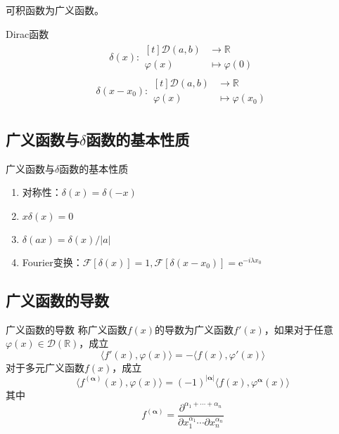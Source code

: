 \documentclass[lang = cn, scheme = chinese, thmcnt = section]{elegantbook}
\newcommand{\R}{\mathbb{R}}            %
\newcommand{\bs}{\boldsymbol}          %
\newcommand{\ee}[1]{\mathrm{e}^{#1}}   %
\begin{document}
\begin{remark}
	可积函数为广义函数。
\end{remark}

\begin{definition}{Dirac函数}
	\begin{align*}
		\delta(x):\begin{aligned}[t]
			\mathscr{D}(a,b) &\longrightarrow \R\\
			\varphi(x) &\longmapsto \varphi(0)
		\end{aligned}
	\end{align*}
	\begin{align*}
		\delta(x-x_0):\begin{aligned}[t]
			\mathscr{D}(a,b) &\longrightarrow \R\\
			\varphi(x) &\longmapsto \varphi(x_0)
		\end{aligned}
	\end{align*}
\end{definition}

\subsection{广义函数与$\delta$函数的基本性质}

\begin{proposition}{广义函数与$\delta$函数的基本性质}
	\begin{enumerate}
		\item 对称性：$\delta(x)=\delta(-x)$
		\item $x\delta(x)=0$
		\item $\delta(ax)=\delta(x)/|a|$
		\item Fourier变换：$\mathscr{F}[\delta(x)]=1,\mathscr{F}[\delta(x-x_0)]=\ee{-i\lambda x_0}$
	\end{enumerate}
\end{proposition}

\subsection{广义函数的导数}

\begin{definition}{广义函数的导数}
	称广义函数$f(x)$的导数为广义函数$f'(x)$，如果对于任意$\varphi(x)\in\mathscr{D}(\R)$，成立%
	$$
	\langle f'(x),\varphi(x) \rangle=-\langle f(x),\varphi'(x) \rangle
	$$
	对于多元广义函数$f(x)$，成立
	$$
	\langle f^{(\bs{\alpha})}(x),\varphi(x) \rangle=(-1)^{|\bs{\alpha}|}\langle f(x),\varphi^{\bs{\alpha}}(x) \rangle
	$$
	其中%
	$$
	f^{(\bs{\alpha})}=\frac{\partial^{\alpha_1+\cdots+\alpha_n}}{\partial x_1^{\alpha_1}\cdots\partial x_n^{\alpha_n}}
	$$
\end{definition}
\end{document}
